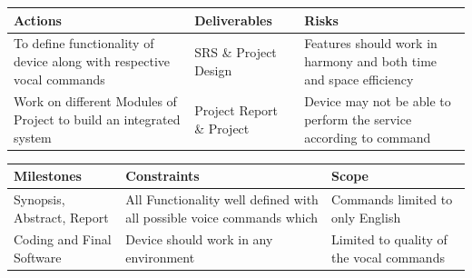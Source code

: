  \begin{table}

\vspace{0.5cm} 
 
\begin{tabular}{ |p{5cm}|p{5cm}|p{5cm}|  }
 \hline
 \textbf{Actions} & \textbf{Deliverables} & \textbf{Risks} \\
 \hline
 To define functionality of device along with respective vocal commands  & SRS \& Project Design & Features should work in harmony and both time and space efficiency\\


  Work on different Modules of Project to build an integrated system & Project Report \& Project & Device may not be able to perform the service according to command\\
   \hline
 
 \end{tabular}
 \end{table}
\vspace{0.5cm} 
\begin{table}
 \begin{tabular}{ |p{5cm}|p{5cm}|p{5cm}|  }
 \hline
 \textbf{Milestones} & \textbf{Constraints} & \textbf{Scope} \\
 \hline
 Synopsis, Abstract, Report & All Functionality well defined with all possible voice commands which & Commands limited to only English\\

  Coding and Final Software  & Device should work in any environment & Limited to quality of the vocal commands\\ 
   \hline
 \end{tabular}
\end{table} 
\pagebreak
\newpage
\noindent\\\\
\\\\
\\\\
\\\\
\\\\
\\\\
\\\\
\\\\
\\\\
\\\\
\\\\
